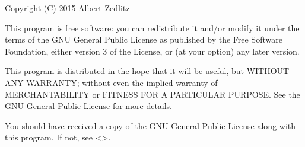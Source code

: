 \documentclass[letterpaper,10pt,english]{sphinxmanual}
\begin{document}
\sphinxAtStartPar
Copyright (C) 2015  Albert Zedlitz

\sphinxAtStartPar
This program is free software: you can redistribute it and/or modify
it under the terms of the GNU General Public License as published by
the Free Software Foundation, either version 3 of the License, or
(at your option) any later version.

\sphinxAtStartPar
This program is distributed in the hope that it will be useful,
but WITHOUT ANY WARRANTY; without even the implied warranty of
MERCHANTABILITY or FITNESS FOR A PARTICULAR PURPOSE.  See the
GNU General Public License for more details.

\sphinxAtStartPar
You should have received a copy of the GNU General Public License
along with this program.  If not, see \textless{}\textgreater{}.
\end{document}
